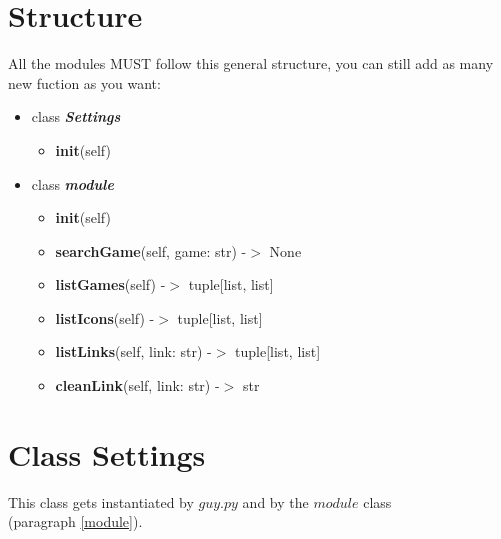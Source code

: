 \documentclass{article}
\begin{document}
\section{Structure} \label{structure}
    All the modules MUST follow this general structure, you can still add as many new fuction as you want:
    \begin{itemize}
        \item class \textit{\textbf{Settings}}
        \begin{itemize}
            \item \textbf{init}(self)
        \end{itemize}
        \item class \textit{\textbf{module}}
        \begin{itemize}
            \item \textbf{init}(self)
            \item \textbf{searchGame}(self, game: str) -$>$ None
            \item \textbf{listGames}(self) -$>$ tuple[list, list]
            \item \textbf{listIcons}(self) -$>$ tuple[list, list]
            \item \textbf{listLinks}(self, link: str) -$>$ tuple[list, list]
            \item \textbf{cleanLink}(self, link: str) -$>$ str
        \end{itemize}
    \end{itemize}

\section{Class Settings} \label{settings}
    This class gets instantiated by $guy.py$ and by the $module$ class\\ (paragraph \ref{module}). \\
    
\end{document}
